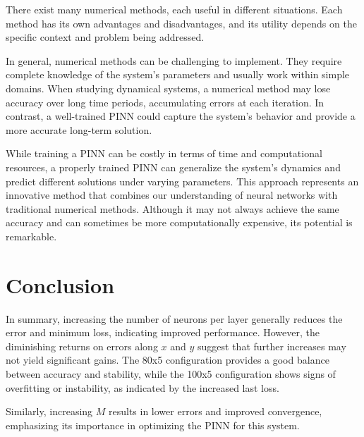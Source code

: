 There exist many numerical methods, each useful in different situations. Each method has its own advantages and disadvantages, and its utility depends on the specific context and problem being addressed.

In general, numerical methods can be challenging to implement. They require complete knowledge of the system's parameters and usually work within simple domains. When studying dynamical systems, a numerical method may lose accuracy over long time periods, accumulating errors at each iteration. In contrast, a well-trained PINN could capture the system's behavior and provide a more accurate long-term solution.

While training a PINN can be costly in terms of time and computational resources, a properly trained PINN can generalize the system's dynamics and predict different solutions under varying parameters. This approach represents an innovative method that combines our understanding of neural networks with traditional numerical methods. Although it may not always achieve the same accuracy and can sometimes be more computationally expensive, its potential is remarkable.

\section{Conclusion}

In summary, increasing the number of neurons per layer generally reduces the error and minimum loss, indicating improved performance. However, the diminishing returns on errors along \( x \) and \( y \) suggest that further increases may not yield significant gains. The 80x5 configuration provides a good balance between accuracy and stability, while the 100x5 configuration shows signs of overfitting or instability, as indicated by the increased last loss. 

Similarly, increasing \( M \) results in lower errors and improved convergence, emphasizing its importance in optimizing the PINN for this system.


